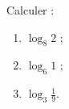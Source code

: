 
\begin{exercice}\label{exoDS_2010_1}
    Calculer :
  \begin{enumerate}
  \item $\log_{8} 2$ ;
    \item $\log_{6} 1$ ;
      \item $\displaystyle \log_{3} \frac{1}{9}$.
  \end{enumerate}


\end{exercice}
